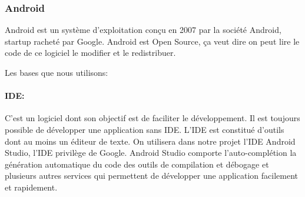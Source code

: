 %
%

\subsubsection{Android}

Android est un système d'exploitation conçu en 2007 par la société Android,
startup racheté par Google. Android est Open Source, ça veut dire on peut lire
le code de ce logiciel le modifier et le redistribuer.

Les bases que nous utilisons:
\paragraph{IDE:}

C'est un logiciel dont son objectif est de faciliter le développement. Il est
toujours possible de développer une application sans IDE\@.
L'IDE est constitué d'outils dont au moins un éditeur de texte.
On utilisera dans notre projet l'IDE Android Studio, l'IDE privilège de Google.
Android Studio comporte l'auto-complétion la génération automatique du code des
outils de compilation et débogage et plusieurs autres services qui permettent de
développer une application facilement et rapidement.

